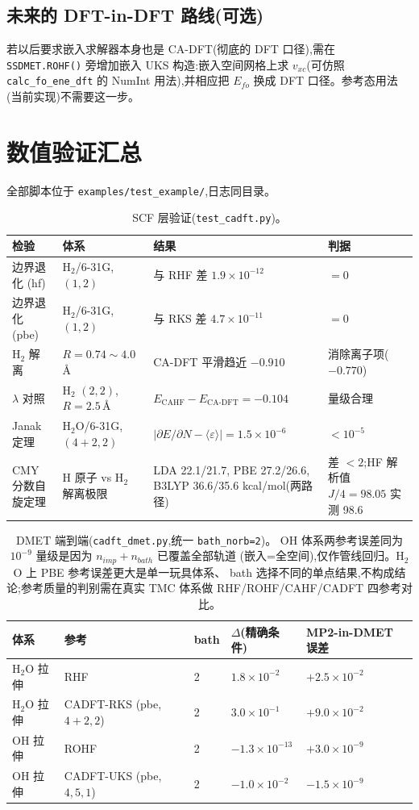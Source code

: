 \documentclass[11pt,a4paper]{ctexart}
\begin{document}
\subsection{未来的 DFT-in-DFT 路线(可选)}

若以后要求嵌入求解器本身也是 CA-DFT(彻底的 DFT 口径),需在
\texttt{SSDMET.ROHF()} 旁增加嵌入 UKS 构造:嵌入空间网格上求
$v_{xc}$(可仿照 \texttt{calc\_fo\_ene\_dft} 的 NumInt 用法),并相应把
$E_{fo}$ 换成 DFT 口径。参考态用法(当前实现)不需要这一步。

\section{数值验证汇总}\label{sec:valid}

全部脚本位于 \texttt{examples/test\_example/},日志同目录。

\begin{table}[h]
\centering
\begin{tabular}{llll}
\toprule
检验 & 体系 & 结果 & 判据 \\
\midrule
边界退化 (hf) & H$_2$/6-31G, $(1,2)$ & 与 RHF 差 $1.9\times10^{-12}$ & $=0$ \\
边界退化 (pbe) & H$_2$/6-31G, $(1,2)$ & 与 RKS 差 $4.7\times10^{-11}$ & $=0$ \\
H$_2$ 解离 & $R=0.74\sim4.0$\,\AA{} & CA-DFT 平滑趋近 $-0.910$ & 消除离子项($-0.770$) \\
$\lambda$ 对照 & H$_2$ $(2,2)$, $R=2.5$\,\AA{} & $E_{\mathrm{CAHF}}-E_{\mathrm{CA\text{-}DFT}}=-0.104$ & 量级合理 \\
Janak 定理 & H$_2$O/6-31G, $(4{+}2,2)$ & $|\partial E/\partial N - \langle\varepsilon\rangle| = 1.5\times10^{-6}$ & $<10^{-5}$ \\
CMY 分数自旋定理 & H 原子 vs H$_2$ 解离极限 & LDA 22.1/21.7, PBE 27.2/26.6, B3LYP 36.6/35.6 kcal/mol(两路径) & 差 $<2$;HF 解析值 $J/4=98.05$ 实测 98.6 \\
\bottomrule
\end{tabular}
\caption{SCF 层验证(\texttt{test\_cadft.py})。}
\end{table}

\begin{table}[h]
\centering
\begin{tabular}{lllll}
\toprule
体系 & 参考 & bath & $\Delta$(精确条件) & MP2-in-DMET 误差 \\
\midrule
H$_2$O 拉伸 & RHF & 2 & $1.8\times10^{-2}$ & $+2.5\times10^{-2}$ \\
H$_2$O 拉伸 & CADFT-RKS (pbe, $4{+}2{,}2$) & 2 & $3.0\times10^{-1}$ & $+9.0\times10^{-2}$ \\
OH 拉伸 & ROHF & 2 & $-1.3\times10^{-13}$ & $+3.0\times10^{-9}$ \\
OH 拉伸 & CADFT-UKS (pbe, $4{,}5{,}1$) & 2 & $-1.0\times10^{-2}$ & $-1.5\times10^{-9}$ \\
\bottomrule
\end{tabular}
\caption{DMET 端到端(\texttt{cadft\_dmet.py},统一 \texttt{bath\_norb=2})。
OH 体系两参考误差同为 $10^{-9}$ 量级是因为 $n_{imp}+n_{bath}$ 已覆盖全部轨道
(嵌入=全空间),仅作管线回归。H$_2$O 上 PBE 参考误差更大是单一玩具体系、
bath 选择不同的单点结果,不构成结论;参考质量的判别需在真实 TMC 体系做
RHF/ROHF/CAHF/CADFT 四参考对比。}
\end{table}
\end{document}
